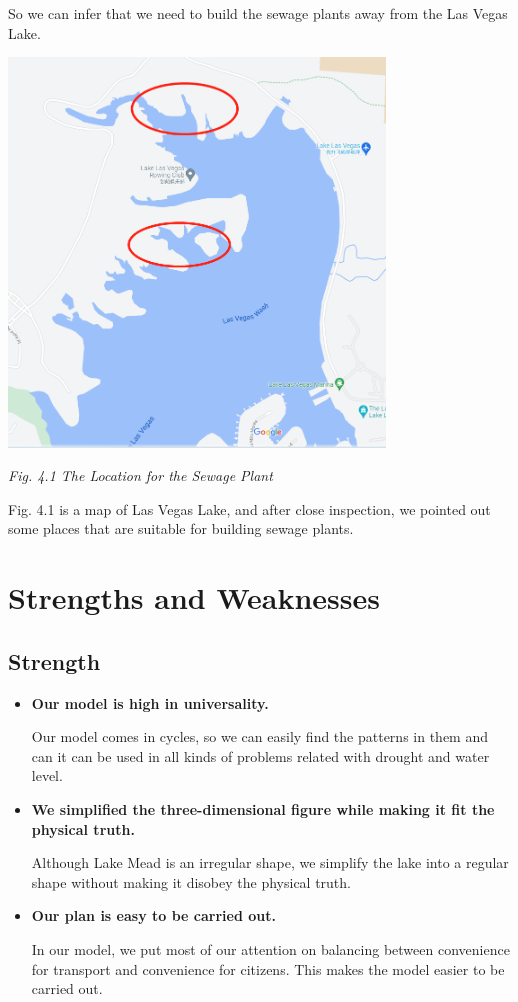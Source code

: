 \documentclass[12pt]{article}
\theoremstyle{definition}
\theoremstyle{remark}
\numberwithin{equation}{section}
\begin{document}
			So we can infer that we need to build the sewage plants away from the Las Vegas Lake.

			\begin{center}
				\includegraphics[width=10cm]{4.1 The Location for the Sewage Plant.png}
				
				\textit{Fig. 4.1 The Location for the Sewage Plant}
			\end{center}

			Fig. 4.1 is a map of Las Vegas Lake, and after close inspection, we pointed out some places that are suitable for building sewage plants.

\newpage
\section{Strengths and Weaknesses}
	\subsection{Strength}
		\begin{itemize}
			\item \textbf{Our model is high in universality.}
			
			Our model comes in cycles, so we can easily find the patterns in them and can it can be used in all kinds of  problems related with drought and water level.

			\item \textbf{We simplified the three-dimensional figure while making it fit the physical truth.}
			
			Although Lake Mead is an irregular shape, we simplify the lake into a regular shape without making it disobey the physical truth.

			\item \textbf{Our plan is easy to be carried out.}
			
			In our model, we put most of our attention on balancing between convenience for transport and convenience for citizens. This makes the model easier to be carried out.
		\end{itemize}
\end{document}
